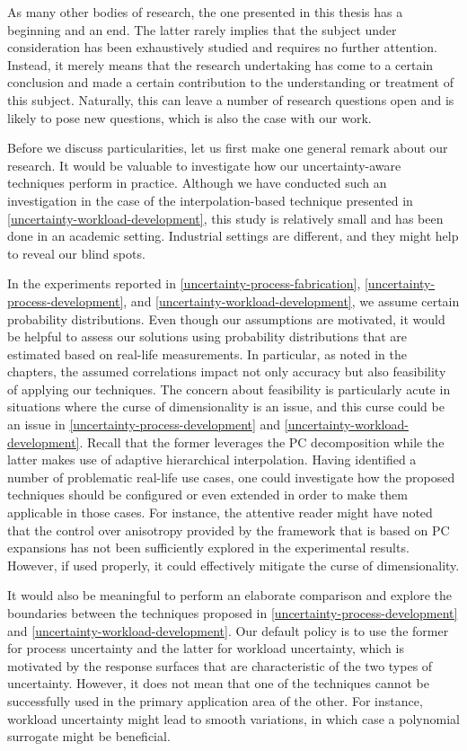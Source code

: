 As many other bodies of research, the one presented in this thesis has a
beginning and an end. The latter rarely implies that the subject under
consideration has been exhaustively studied and requires no further attention.
Instead, it merely means that the research undertaking has come to a certain
conclusion and made a certain contribution to the understanding or treatment of
this subject. Naturally, this can leave a number of research questions open and
is likely to pose new questions, which is also the case with our work.

Before we discuss particularities, let us first make one general remark about
our research. It would be valuable to investigate how our uncertainty-aware
techniques perform in practice. Although we have conducted such an investigation
in the case of the interpolation-based technique presented in
\cref{uncertainty-workload-development}, this study is relatively small and has
been done in an academic setting. Industrial settings are different, and they
might help to reveal our blind spots.

In the experiments reported in \cref{uncertainty-process-fabrication},
\cref{uncertainty-process-development}, and
\cref{uncertainty-workload-development}, we assume certain probability
distributions. Even though our assumptions are motivated, it would be helpful to
assess our solutions using probability distributions that are estimated based on
real-life measurements. In particular, as noted in the chapters, the assumed
correlations impact not only accuracy but also feasibility of applying our
techniques. The concern about feasibility is particularly acute in situations
where the curse of dimensionality is an issue, and this curse could be an issue
in \cref{uncertainty-process-development} and
\cref{uncertainty-workload-development}. Recall that the former leverages the
\ac{PC} decomposition while the latter makes use of adaptive hierarchical
interpolation. Having identified a number of problematic real-life use cases,
one could investigate how the proposed techniques should be configured or even
extended in order to make them applicable in those cases. For instance, the
attentive reader might have noted that the control over anisotropy provided by
the framework that is based on \ac{PC} expansions has not been sufficiently
explored in the experimental results. However, if used properly, it could
effectively mitigate the curse of dimensionality.

It would also be meaningful to perform an elaborate comparison and explore the
boundaries between the techniques proposed in
\cref{uncertainty-process-development} and
\cref{uncertainty-workload-development}. Our default policy is to use the former
for process uncertainty and the latter for workload uncertainty, which is
motivated by the response surfaces that are characteristic of the two types of
uncertainty. However, it does not mean that one of the techniques cannot be
successfully used in the primary application area of the other. For instance,
workload uncertainty might lead to smooth variations, in which case a polynomial
surrogate might be beneficial.

